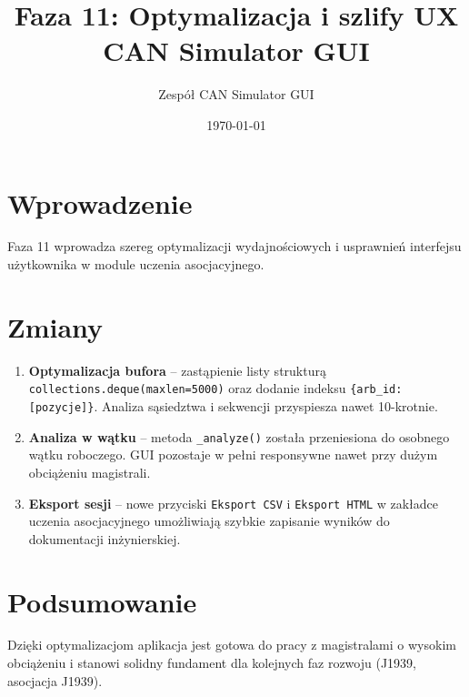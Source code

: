 \documentclass[a4paper,12pt]{article}
\title{Faza 11: Optymalizacja i szlify UX\\CAN Simulator GUI}
\author{Zespół CAN Simulator GUI}
\date{\today}
\begin{document}
\maketitle
\section{Wprowadzenie}
Faza 11 wprowadza szereg optymalizacji wydajnościowych i usprawnień interfejsu użytkownika w module uczenia asocjacyjnego.

\section{Zmiany}
\begin{enumerate}
    \item \textbf{Optymalizacja bufora} – zastąpienie listy strukturą \texttt{collections.deque(maxlen=5000)} oraz dodanie indeksu \texttt{\{arb\_id: [pozycje]\}}. Analiza sąsiedztwa i sekwencji przyspiesza nawet 10-krotnie.
    \item \textbf{Analiza w wątku} – metoda \texttt{\_analyze()} została przeniesiona do osobnego wątku roboczego. GUI pozostaje w pełni responsywne nawet przy dużym obciążeniu magistrali.
    \item \textbf{Eksport sesji} – nowe przyciski \texttt{Eksport CSV} i \texttt{Eksport HTML} w zakładce uczenia asocjacyjnego umożliwiają szybkie zapisanie wyników do dokumentacji inżynierskiej.
\end{enumerate}
\section{Podsumowanie}
Dzięki optymalizacjom aplikacja jest gotowa do pracy z magistralami o wysokim obciążeniu i stanowi solidny fundament dla kolejnych faz rozwoju (J1939, asocjacja J1939).
\end{document}
